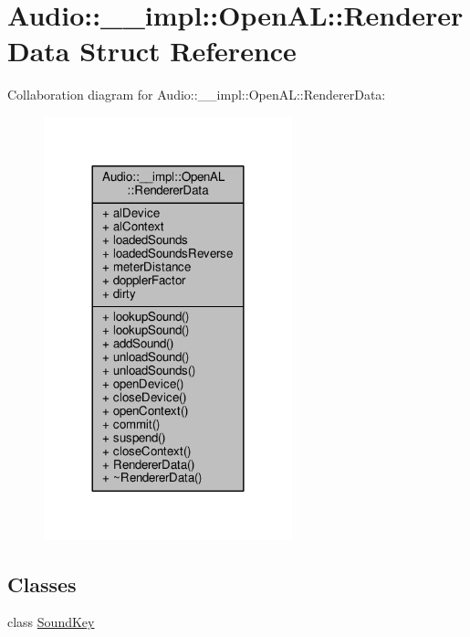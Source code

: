\hypertarget{structAudio_1_1____impl_1_1OpenAL_1_1RendererData}{}\section{Audio\+:\+:\+\_\+\+\_\+impl\+:\+:Open\+AL\+:\+:Renderer\+Data Struct Reference}
\label{structAudio_1_1____impl_1_1OpenAL_1_1RendererData}


Collaboration diagram for Audio\+:\+:\+\_\+\+\_\+impl\+:\+:Open\+AL\+:\+:Renderer\+Data\+:
\nopagebreak
\begin{figure}[H]
\begin{center}
\leavevmode
\includegraphics[width=204pt]{df/d98/structAudio_1_1____impl_1_1OpenAL_1_1RendererData__coll__graph}
\end{center}
\end{figure}
\subsection*{Classes}
\begin{DoxyCompactItemize}
\item 
class \hyperlink{classAudio_1_1____impl_1_1OpenAL_1_1RendererData_1_1SoundKey}{Sound\+Key}
\end{DoxyCompactItemize}
